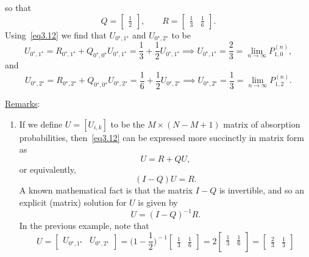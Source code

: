 \begin{Example}
    so that
    \[ Q=\begin{bmatrix}
            \frac{1}{2}
        \end{bmatrix},\qquad R=\begin{bmatrix}
            \frac{1}{3} & \frac{1}{6}
        \end{bmatrix}. \]
    Using~\ref{eq3.12} we find that $ U_{0^\star,1^\star} $ and $ U_{0^\star,2^\star} $ to be
    \[ U_{0^\star,1^\star}=R_{0^\star,1^\star}+Q_{0^\star,0^\star}U_{0^\star,1^\star}=\frac{1}{3}+\frac{1}{2}U_{0^\star,1^\star}\implies U_{0^\star,1^\star}=\frac{2}{3}=\lim\limits_{{n} \to {\infty}} P_{1,0}^{(n)}, \]
    and
    \[ U_{0^\star,2^\star}=R_{0^\star,2^\star}+Q_{0^\star,0^\star}U_{0^\star,2^\star}=\frac{1}{6} +\frac{1}{2} U_{0^\star,2^\star}\implies U_{0^\star,2^\star}=\frac{1}{3} =\lim\limits_{{n} \to {\infty}} P_{1,2}^{(n)}. \]
\end{Example}
\noindent\underline{Remarks}:
\begin{enumerate}[(1)]
    \item If we define $U=[U_{i, k}]$ to be the $M \times(N-M+1)$ matrix of absorption probabilities,
          then~\ref{eq3.12} can be expressed more succinctly in matrix form as
          \[ U=R+Q U, \]
          or equivalently,
          \[ (I-Q) U=R. \]
          A known mathematical fact is that the matrix $I-Q$ is invertible, and so an explicit (matrix) solution for $U$ is given by
          \[ U=(I-Q)^{-1}R.\label{eq3.13}\tag*{(3.13)} \]
          In the previous example, note that
          \[
              U=\begin{bmatrix}
                  U_{0^\star,1^\star} & U_{0^\star,2^\star}
              \end{bmatrix}
              =\biggl(1-\frac{1}{2} \biggr)^{\!-1}\begin{bmatrix}
                  \frac{1}{3} & \frac{1}{6}
              \end{bmatrix}
              =2 \begin{bmatrix}
                  \frac{1}{3} & \frac{1}{6} \\
              \end{bmatrix}
              =\begin{bmatrix}
                  \frac{2}{3} & \frac{1}{3}
              \end{bmatrix}\]
\end{enumerate}

